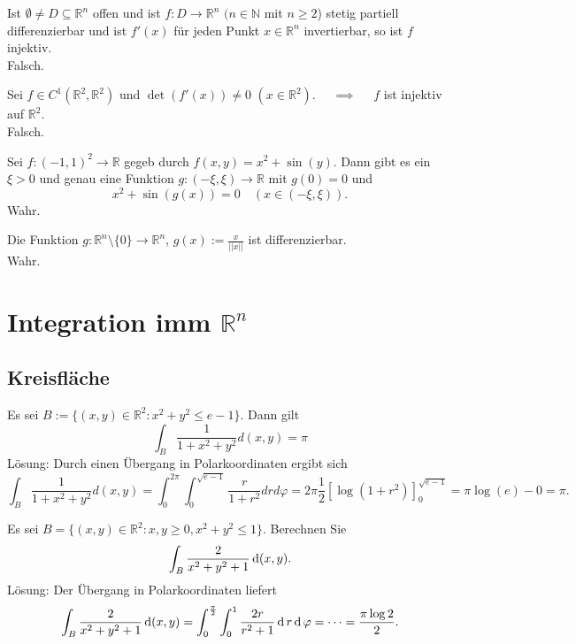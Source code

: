 \documentclass[parskip=full]{scrartcl}
\begin{document}
Ist $\emptyset \neq D \subseteq \mathbb{R}^n$ offen und ist $f : D \to \mathbb{R}^n$ $(n \in \mathbb{N}$ mit $n \geq 2$) stetig partiell differenzierbar und ist $f'(x)$ für jeden Punkt $x \in \mathbb{R}^n$ invertierbar, so ist $f$ injektiv.\\
Falsch.

Sei $f \in C^1(\mathbb{R}^2, \mathbb{R}^2)$ und $\det(f'(x)) \neq 0$ $(x \in \mathbb{R}^2)$. $\quad \implies \quad$ $f$ ist injektiv auf $\mathbb{R}^2$.\\
Falsch.

Sei $f : (-1,1)^2 \to \mathbb{R}$ gegeb durch $f(x,y) = x^2 + \sin(y)$.
Dann gibt es ein $\xi > 0$ und genau eine Funktion $g : (-\xi, \xi) \to \mathbb{R}$ mit $g(0) = 0$ und
\begin{displaymath}
  x^2 + \sin(g(x)) = 0 \quad (x \in (-\xi, \xi)).
\end{displaymath}
Wahr.

Die Funktion $g : \mathbb{R}^n \setminus \{0\} \to \mathbb{R}^n$, $g(x) := \frac{x}{||x||}$ ist differenzierbar.\\
Wahr.

\section{Integration imm $\mathbb{R}^n$}
\subsection{Kreisfläche}
Es sei $B:= \{(x,y) \in \mathbb{R}^2 : x^2 + y^2 \leq e - 1\}$.
Dann gilt
\begin{displaymath}
  \int_{B} \frac{1}{1 + x^2 + y^2}d(x,y) = \pi
\end{displaymath}
Lösung:
Durch einen Übergang in Polarkoordinaten ergibt sich
\begin{displaymath}
  \int_{B} \frac{1}{1 + x^2 + y^2} d(x,y) = \int_{0}^{2\pi} \int_{0}^{\sqrt{e - 1}} \frac{r}{1 + r^2} drd\varphi = 2\pi \frac{1}{2}[\log(1 + r^2)]_{0}^{\sqrt{e-1}} = \pi \log(e) - 0 = \pi.
\end{displaymath}

Es sei $B = \{(x,y) \in \mathbb{R}^2 : x,y \geq 0, x^2 + y^2 \leq 1\}$.
Berechnen Sie
\begin{displaymath}
  \int_B \frac{2}{x^2 + y^2 + 1} \operatorname{\mathop{}\!\mathrm{d}} (x,y).
\end{displaymath}
Lösung:
Der Übergang in Polarkoordinaten liefert
\begin{displaymath}
  \int_B \frac{2}{x^2 + y^2 + 1} \operatorname{\mathop{}\!\mathrm{d}} (x,y) = \int_0^{\frac{\pi}{2}} \int_0^1 \frac{2r}{r^2 + 1} \operatorname{\mathop{}\!\mathrm{d}} r \operatorname{\mathop{}\!\mathrm{d}} \varphi = \dots = \frac{\pi \log 2}{2}.
\end{displaymath}
\end{document}
